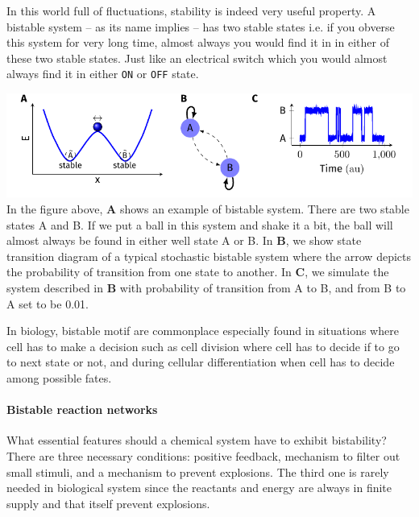 \documentclass[]{resonance}
\begin{document}
 {
    In this world full of fluctuations, stability is indeed very useful
    property. A bistable system -- as its name implies -- has two stable 
    states i.e. if you obverse this system for very long time, almost always 
    you would find it in in either of these two stable states. Just like an electrical switch
    which you would almost always find it in either \texttt{ON} or \texttt{OFF}
    state.

    \vspace{3mm} \includegraphics[width=\linewidth]{./stability_noise.pdf} In
    the figure above, \textbf{A} shows an example of bistable system.  There
    are two stable states A and B. If we put a ball in this system and shake it
    a bit, the ball will almost always be found in either well state A or B. In \textbf{B}, 
    we show state transition diagram of a typical stochastic bistable system
    where the arrow depicts the probability of transition from one state to
    another. In \textbf{C}, we simulate the system
    described in \textbf{B} with probability of transition from A to B, and from B to
    A set to be 0.01. 

    In biology, bistable motif are commonplace especially found in situations
    where cell has to make a decision such as  cell division where cell has to 
    decide if to go to next state or not, and during cellular differentiation
    when cell has to decide among possible fates\cite{wilhelm}.

    \paragraph{Bistable reaction networks} What essential features should a chemical
    system have to exhibit bistability? There are three necessary conditions:
    positive feedback, mechanism to filter out small stimuli, and a mechanism to
    prevent explosions\cite{wilhelm}. The third one is rarely needed in
    biological system since the reactants and energy are always in finite supply
    and that itself prevent explosions.
}
\end{document}
